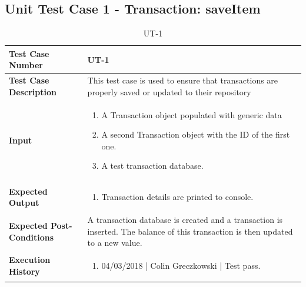 \documentclass[12pt]{article}
\begin{document}
\subsection{Unit Test Case 1 - Transaction: saveItem}
\def\arraystretch{1.5}%
\begin{table}[htbp]
\centering
\caption {UT-1}
\label{UT-1}
\begin{tabularx}{\textwidth}{ | l | X |}
\hline
\textbf{Test Case Number}      &  UT-1                         \\ \hline
\textbf{Test Case Description}    &  This test case is used to ensure that transactions are properly saved or updated to their repository                \\ \hline
\textbf{Input}         & 	\begin{enumerate}
	\item A Transaction object populated with generic data
          \item A second Transaction object with the ID of the first one.
	\item A test transaction database.
\end{enumerate} \\ \hline

\textbf{Expected Output}     & \begin{enumerate}
	\item Transaction details are printed to console.
\end{enumerate} \\ \hline
\textbf{Expected Post-Conditions}           &  A transaction database is created and a transaction is inserted. The balance of this transaction is then updated to a new value.                   \\ \hline
\textbf{Execution History}   &  \begin{enumerate}
	\item 04/03/2018 | Colin Greczkowski | Test pass.
\end {enumerate} \\ \hline
\end{tabularx}
\end{table}
\clearpage

\end{document}
